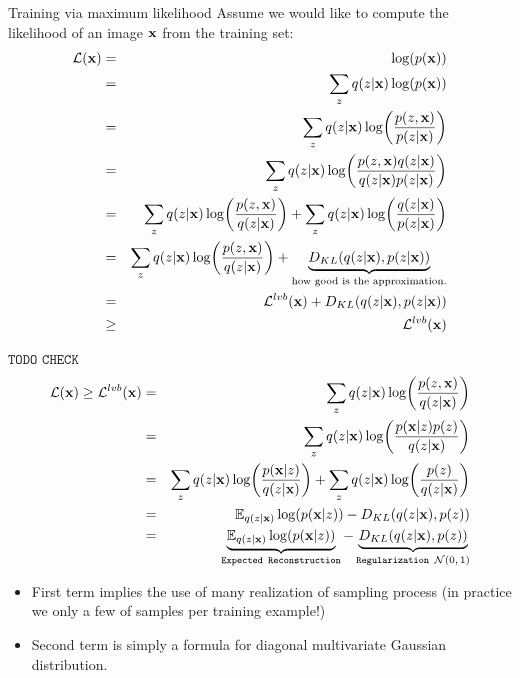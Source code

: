 \documentclass[xcolor=pdftex,dvipsnames,table,mathserif]{beamer}
\begin{document}
\begin{frame}{ Training via maximum likelihood}
Assume we would like to compute the likelihood of an image $\mathbf{x}$ from the training set:
\begin{eqnarray*}
\mathcal{L}(\mathbf{x}) &=&\log(p(\mathbf{x})) \\
&=& \sum_{z} q(z|\mathbf{x}) \log(p(\mathbf{x})) \\
&=& \sum_{z} q(z|\mathbf{x}) \log(\frac{p(z,\mathbf{x})}{p(z | \mathbf{x})}) \\
&=& \sum_{z} q(z|\mathbf{x}) \log(\frac{p(z,\mathbf{x}) q(z|\mathbf{x})}{q(z|\mathbf{x}) p(z | \mathbf{x})}) \\
&=&  \sum_{z} q(z|\mathbf{x}) \log(\frac{p(z,\mathbf{x}) }{q(z|\mathbf{x})}) + \sum_{z} q(z|\mathbf{x}) \log(\frac{q(z|\mathbf{x}) }{p(z|\mathbf{x})}) \\
&=& \sum_{z} q(z|\mathbf{x}) \log(\frac{p(z,\mathbf{x}) }{q(z|\mathbf{x})})+ \underbrace{D_{KL}(q(z|\mathbf{x}),p(z|\mathbf{x}))}_{\text{how good is the approximation.}}\\
&=& \mathcal{L}^{lvb}(\mathbf{x})+D_{KL}(q(z|\mathbf{x}),p(z|\mathbf{x})) \\
&\geq& \mathcal{L}^{lvb}(\mathbf{x})
\end{eqnarray*}
\end{frame}


\begin{frame}
$ \texttt{TODO CHECK}$
\begin{eqnarray*}
 \mathcal{L}(\mathbf{x}) \geq \mathcal{L}^{lvb}(\mathbf{x}) &=& \sum_{z} q(z|\mathbf{x}) \log(\frac{p(z,\mathbf{x}) }{q(z|\mathbf{x})}) \\
 &=& \sum_{z} q(z|\mathbf{x}) \log(\frac{p(\mathbf{x} | z) p(z)}{q(z|\mathbf{x})}) \\
 &=& \sum_{z} q(z|\mathbf{x}) \log(\frac{p(\mathbf{x} | z)}{q(z|\mathbf{x})}) +  \sum_{z} q(z|\mathbf{x}) \log(\frac{p(z)}{q(z|\mathbf{x})}) \\
 &=& \mathbb{E}_{q(z|\mathbf{x})} \log(p(\mathbf{x} | z)) -D_{KL}(q(z|\mathbf{x}),p(z))\\
  &=& \underbrace{\mathbb{E}_{q(z|\mathbf{x})} \log(p(\mathbf{x} | z))}_{\texttt{Expected Reconstruction}} - \underbrace{D_{KL}(q(z|\mathbf{x}),p(z))}_{\texttt{Regularization $\mathcal{N}(0,1)$}}\\
\end{eqnarray*}
\begin{itemize}
\item First term implies the use of many realization of sampling process (in practice we only a few of samples per training example!)
\item Second term is simply a formula for diagonal multivariate Gaussian distribution.
\end{itemize}
\end{frame}
\end{document}

